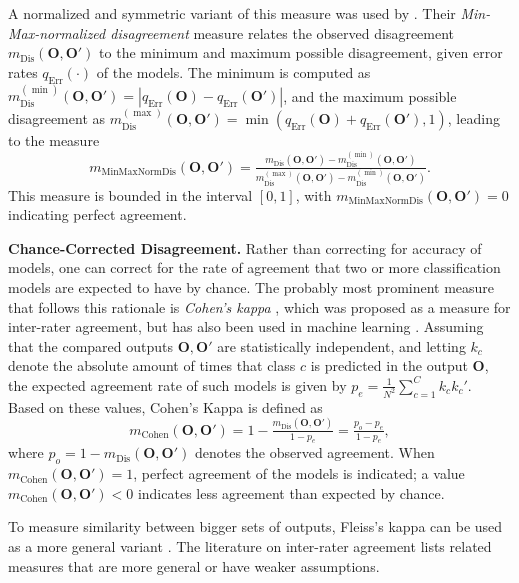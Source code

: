 \documentclass{article}
\newcommand{\citet}{\textcite}
\newcommand{\Out}{\bm{O}}
\newcommand{\Outp}{\bm{O'}}
\newcommand{\subheader}{\textbf}
\begin{document}
A normalized and symmetric variant of this measure was used by  \citet{klabunde_prediction_2023}.
Their \emph{Min-Max-normalized disagreement} measure relates the observed disagreement $m_{\operatorname{Dis}}(\Out, \Outp)$ to the minimum and maximum possible disagreement, given error rates $q_{\operatorname{Err}}(\cdot)$ of the models.
The minimum is computed as $m_{\operatorname{Dis}}^{(\min)}(\Out, \Outp) = |q_{\operatorname{Err}}(\Out) -  q_{\operatorname{Err}}(\Outp)|$, and the maximum possible disagreement as $m_{\operatorname{Dis}}^{(\max)}(\Out, \Outp) = \min( q_{\operatorname{Err}}(\Out) + q_{\operatorname{Err}}(\Outp), 1)$, leading to the measure
\begin{equation}
    m_{\operatorname{MinMaxNormDis}}(\Out, \Outp) =
    \tfrac{m_{\operatorname{Dis}}(\Out, \Outp) - m_{\operatorname{Dis}}^{(\min)}(\Out, \Outp)}{m_{\operatorname{Dis}}^{(\max)}(\Out, \Outp) - m_{\operatorname{Dis}}^{(\min)}(\Out, \Outp)}.
\end{equation}
This measure is bounded in the interval $[0,1]$, with $m_{\operatorname{MinMaxNormDis}}(\Out, \Outp) = 0$ indicating perfect agreement. %


\subheader{Chance-Corrected Disagreement.}
Rather than correcting for accuracy of models, one can correct for the rate of agreement that two or more classification models are expected to have by chance.
The probably most prominent measure that follows this rationale is \emph{Cohen's kappa} \cite{cohen_coefficient_1960}, which was proposed as a measure for inter-rater agreement, but has also been used in machine learning \cite{celikyilmaz_evaluation_2021,geirhos_beyond_2020}.
Assuming that the compared outputs $\Out, \Outp$ are statistically independent, and letting $k_c$ denote the absolute amount of times that class $c$ is predicted in the output $\Out$, the expected agreement rate of such models is given by $p_e=\tfrac{1}{N^2}\textstyle\sum_{c=1}^C k_c k_c'$.
Based on these values, Cohen's Kappa is defined as
\begin{equation}
    m_{\text{Cohen}}(\Out, \Outp) = 1 - \tfrac{m_{\text{Dis}}(\Out, \Outp)}{1-p_e}=\tfrac{p_o-p_e}{1-p_e},
\end{equation}
where $p_o=1-m_{\text{Dis}}(\Out, \Outp)$ denotes the observed agreement.
When $m_{\text{Cohen}}(\Out, \Outp) = 1$, perfect agreement of the models is indicated; a value $m_{\text{Cohen}}(\Out, \Outp) < 0$ indicates less agreement than expected by chance.

To measure similarity between bigger sets of outputs, Fleiss's kappa \cite{fleiss_measuring_1971} can be used as a more general variant \cite{du_measuring_2023}.
The literature on inter-rater agreement \cite{feng_mistakes_2014} lists related measures that are more general or have weaker assumptions.
\end{document}
